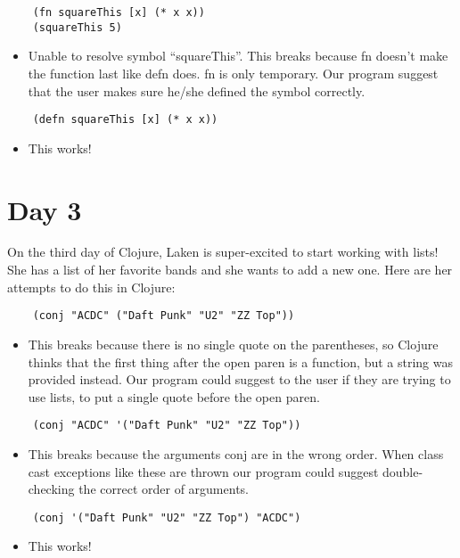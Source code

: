 \documentclass[12pt]{article}
\begin{document}
\begin{verbatim}
	(fn squareThis [x] (* x x))
	(squareThis 5)
\end{verbatim}
\begin{itemize}
	\item Unable to resolve symbol “squareThis”. This breaks because fn doesn’t make the function last like defn does. fn is only temporary. Our program suggest that the user makes sure he/she defined the symbol correctly.
\end{itemize}

\begin{verbatim}
	(defn squareThis [x] (* x x))
\end{verbatim}
\begin{itemize}
	\item This works!
\end{itemize}

\section{Day 3}
On the third day of Clojure, Laken is super-excited to start working with lists! She has a list of her favorite bands and she wants to add a new one. Here are her attempts to do this in Clojure:
\begin{verbatim}
	(conj "ACDC" ("Daft Punk" "U2" "ZZ Top"))
\end{verbatim}
\begin{itemize}
	\item This breaks because there is no single quote on the parentheses, so Clojure thinks that the first thing after the open paren is a function, but a string was provided instead. Our program could suggest to the user if they are trying to use lists, to put a single quote before the open paren. 
\end{itemize}

\begin{verbatim}
	(conj "ACDC" '("Daft Punk" "U2" "ZZ Top"))
\end{verbatim}
\begin{itemize}
	\item This breaks because the arguments conj are in the wrong order. When class cast exceptions like these are thrown our program could suggest double-checking the correct order of arguments.
\end{itemize}

\begin{verbatim}
	(conj '("Daft Punk" "U2" "ZZ Top") "ACDC")
\end{verbatim}
\begin{itemize}
	\item This works!
\end{itemize}
\end{document}
